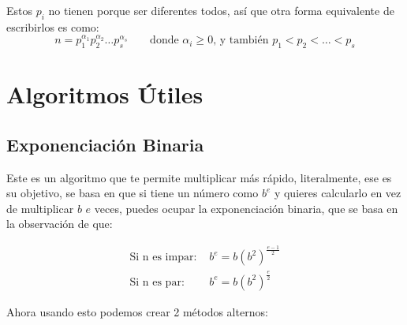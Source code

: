 \documentclass[12pt, fleqn]{report}                             %
\DeclareMathOperator \Space {\quad}                             %
\begin{document}
            Estos $p_i$ no tienen porque ser diferentes todos, así que 
            otra forma equivalente de escribirlos es como:
            \begin{equation}
                n = p_1^{\alpha_1}p_2^{\alpha_2} \dots p_s^{\alpha_s}
                \Space
                \text{ donde }
                \alpha_i \geq 0 \text{, y también } p_1 < p_2 < \dots < p_s
            \end{equation}








\chapter{Algoritmos Útiles}
    \clearpage

    \section{Exponenciación Binaria}

        Este es un algoritmo que te permite multiplicar más rápido, literalmente, ese es 
        su objetivo, se basa en que si tiene un número como $b^e$ y quieres calcularlo
        en vez de multiplicar $b$ $e$ veces, puedes ocupar la exponenciación binaria, 
        que se basa en la observación de que:

        \begin{equation}
        \begin{split}
            \text{Si n es impar: }  &   b^e = b (b^2)^{\frac{e-1}{2}}   \\
            \text{Si n es par: }    &   b^e = b (b^2)^{\frac{e}{2}}
        \end{split}
        \end{equation}


        Ahora usando esto podemos crear 2 métodos alternos:

        \clearpage
\end{document}
